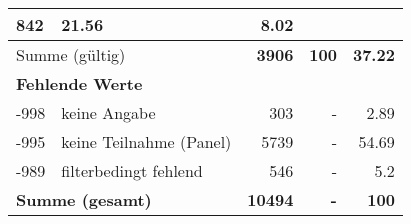 \begin{longtable}{lXrrr}
       \num{842} &
       \num[round-mode=places,round-precision=2]{21,56} &
         \num[round-mode=places,round-precision=2]{8,02} \\
     \midrule
     \multicolumn{2}{l}{Summe (gültig)} &
       \textbf{\num{3906}} &
     \textbf{100} &
       \textbf{\num[round-mode=places,round-precision=2]{37,22}} \\
     \multicolumn{5}{l}{\textbf{Fehlende Werte}}\\
       -998 &
       keine Angabe &
         \num{303} &
        - &
         \num[round-mode=places,round-precision=2]{2,89} \\
       -995 &
       keine Teilnahme (Panel) &
         \num{5739} &
        - &
         \num[round-mode=places,round-precision=2]{54,69} \\
       -989 &
       filterbedingt fehlend &
         \num{546} &
        - &
         \num[round-mode=places,round-precision=2]{5,2} \\
     \midrule
     \multicolumn{2}{l}{\textbf{Summe (gesamt)}} &
          \textbf{\num{10494}} &
        \textbf{-} &
        \textbf{100} \\
     \bottomrule
     \end{longtable}
     
